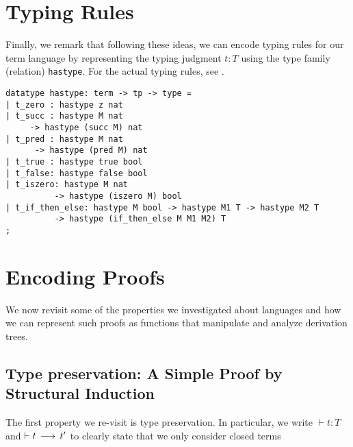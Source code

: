 \section{Typing Rules}
Finally, we remark that following these ideas, we can encode typing rules for
our term language by representing the typing judgment $t : T$ using the type
family (relation) \lstinline!hastype!. For the actual typing rules,
see \cite[Ch ?, Fig. ?]{TAPL}.


\begin{lstlisting}
datatype hastype: term -> tp -> type =
| t_zero : hastype z nat
| t_succ : hastype M nat
     -> hastype (succ M) nat
| t_pred : hastype M nat
      -> hastype (pred M) nat
| t_true : hastype true bool
| t_false: hastype false bool
| t_iszero: hastype M nat
          -> hastype (iszero M) bool
| t_if_then_else: hastype M bool -> hastype M1 T -> hastype M2 T
          -> hastype (if_then_else M M1 M2) T
;
\end{lstlisting}



\section{Encoding Proofs}
We now revisit some of the properties we investigated about languages
and how we can represent such proofs as functions that manipulate and
analyze derivation trees.

\subsection{Type preservation: A Simple Proof by Structural Induction} The first property we re-visit is type
preservation. In particular, we write $\vdash t : T$ and $\vdash t
\mathrel{\,\longrightarrow\,} t'$ to clearly state that we only consider closed terms

